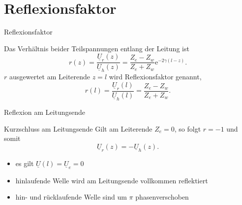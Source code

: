\documentclass{beamer}
\begin{document}
\section{Reflexionsfaktor}


\begin{frame}{Reflexionsfaktor}
\begin{figure}[!htb]
    \begin{center}
        
    \end{center}
\end{figure}

Das Verhältnis beider Teilspannungen entlang der Leitung ist
\[
r(z) = \frac{\underline{U}_{r}(z)}{\underline{U}_{h}(z)} =
       \frac{Z_{e}-Z_{w}}{Z_{e}+Z_{w}} \mathrm{e}^{-2 \gamma (l-z)}.
\]
$r$ ausgewertet am Leiterende $z = l$ wird Reflexionsfaktor genannt,
\begin{equation}
    r(l) = \frac{\underline{U}_{r}(l)}{\underline{U}_{h}(l)} = \frac{Z_{e}-Z_{w}}{Z_{e}+Z_{w}} \label{eq:RFactor}.
\end{equation}

\end{frame}


\begin{frame}{Reflexion am Leitungsende}

\begin{figure}[!htb]
    \begin{center}
        
    \end{center}
\end{figure}

\end{frame}


\begin{frame}{Kurzschluss am Leitungsende}
Gilt am Leiterende $Z_{e} = 0$, so folgt $r = -1$ und somit
\[
\underline{U}_{r}(z) = - \underline{U}_{h}(z).
\]

\begin{itemize}
    \item<2-> es gilt $\underline{U}(l) = \underline{U}_{e} = 0$
    \item<3-> hinlaufende Welle wird am Leitungsende vollkommen reflektiert
    \item<4-> hin- und rücklaufende Welle sind um $\pi$ phasenverschoben
\end{itemize}

\end{frame}
\end{document}
